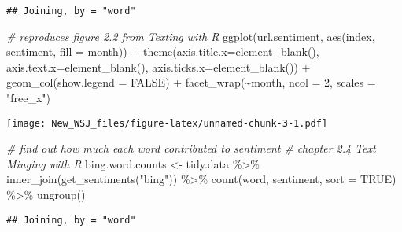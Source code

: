 \documentclass[
]{article}
\newenvironment{Shaded}{\begin{snugshade}}{\end{snugshade}}
\newcommand{\AttributeTok}[1]{\textcolor[rgb]{0.77,0.63,0.00}{#1}}
\newcommand{\CommentTok}[1]{\textcolor[rgb]{0.56,0.35,0.01}{\textit{#1}}}
\newcommand{\ConstantTok}[1]{\textcolor[rgb]{0.00,0.00,0.00}{#1}}
\newcommand{\DecValTok}[1]{\textcolor[rgb]{0.00,0.00,0.81}{#1}}
\newcommand{\FunctionTok}[1]{\textcolor[rgb]{0.00,0.00,0.00}{#1}}
\newcommand{\NormalTok}[1]{#1}
\newcommand{\OtherTok}[1]{\textcolor[rgb]{0.56,0.35,0.01}{#1}}
\newcommand{\SpecialCharTok}[1]{\textcolor[rgb]{0.00,0.00,0.00}{#1}}
\newcommand{\StringTok}[1]{\textcolor[rgb]{0.31,0.60,0.02}{#1}}
\begin{document}
\begin{verbatim}
## Joining, by = "word"
\end{verbatim}

\begin{Shaded}
\begin{Highlighting}[]
\CommentTok{\# reproduces figure 2.2 from Texting with R}
\FunctionTok{ggplot}\NormalTok{(url.sentiment, }\FunctionTok{aes}\NormalTok{(index, sentiment, }\AttributeTok{fill =}\NormalTok{ month)) }\SpecialCharTok{+}
  \FunctionTok{theme}\NormalTok{(}\AttributeTok{axis.title.x=}\FunctionTok{element\_blank}\NormalTok{(),}
        \AttributeTok{axis.text.x=}\FunctionTok{element\_blank}\NormalTok{(),}
        \AttributeTok{axis.ticks.x=}\FunctionTok{element\_blank}\NormalTok{()) }\SpecialCharTok{+}
  \FunctionTok{geom\_col}\NormalTok{(}\AttributeTok{show.legend =} \ConstantTok{FALSE}\NormalTok{) }\SpecialCharTok{+}
  \FunctionTok{facet\_wrap}\NormalTok{(}\SpecialCharTok{\textasciitilde{}}\NormalTok{month, }\AttributeTok{ncol =} \DecValTok{2}\NormalTok{, }\AttributeTok{scales =} \StringTok{"free\_x"}\NormalTok{)}
\end{Highlighting}
\end{Shaded}

\texttt{[image: New\_WSJ\_files/figure-latex/unnamed-chunk-3-1.pdf]}

\begin{Shaded}
\begin{Highlighting}[]
\CommentTok{\# find out how much each word contributed to sentiment}
\CommentTok{\# chapter 2.4 Text Minging with R}
\NormalTok{bing.word.counts }\OtherTok{\textless{}{-}}\NormalTok{ tidy.data }\SpecialCharTok{\%\textgreater{}\%}
  \FunctionTok{inner\_join}\NormalTok{(}\FunctionTok{get\_sentiments}\NormalTok{(}\StringTok{"bing"}\NormalTok{)) }\SpecialCharTok{\%\textgreater{}\%}
  \FunctionTok{count}\NormalTok{(word, sentiment, }\AttributeTok{sort =} \ConstantTok{TRUE}\NormalTok{) }\SpecialCharTok{\%\textgreater{}\%}
  \FunctionTok{ungroup}\NormalTok{()}
\end{Highlighting}
\end{Shaded}

\begin{verbatim}
## Joining, by = "word"
\end{verbatim}
\end{document}
